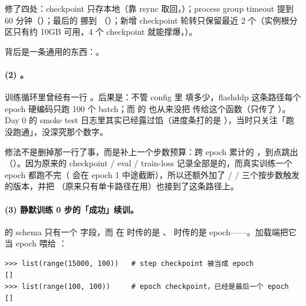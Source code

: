 修了四处：checkpoint 只存本地（靠 rsync 取回，）；process group timeout 提到 60 分钟（）；最后的  挪到  （）；新增 checkpoint 轮转只保留最近 2 个（实例根分区只有约 10GB 可用，4 个 checkpoint 就能撑爆，）。

背后是一条通用的东西：。

\paragraph{(2) 。}训练循环里曾经有一行 。后果是：不管 config 里  填多少，flashddp 这条路径每个 epoch 硬编码只跑 100 个 batch；而  的  也从来没把  传给这个函数（只传了 ）。Day 0 的 smoke test 日志里其实已经露过馅（进度条打的是 ），当时只关注「跑没跑通」，没深究那个数字。

修法不是删掉那一行了事，而是补上一个步数预算：跨 epoch 累计的 ，到点跳出（）。因为原来的 checkpoint / eval / train-loss 记录全部是的，而真实训练一个 epoch 都跑不完（ 会在 epoch 1 中途截断），所以还额外加了  /  /  三个按步数触发的版本，并把 （原来只有单卡路径在用）也接到了这条路径上。

\paragraph{(3) 静默训练 0 步的「成功」续训。} 的 schema 只有一个  字段，而  在  时传的是 、 时传的是 epoch——。加载端把它当 epoch 喂给 ：

\begin{lstlisting}[style=hlrepl]
>>> list(range(15000, 100))   # step checkpoint 被当成 epoch
[]
>>> list(range(100, 100))     # epoch checkpoint，已经是最后一个 epoch
[]
\end{lstlisting}

